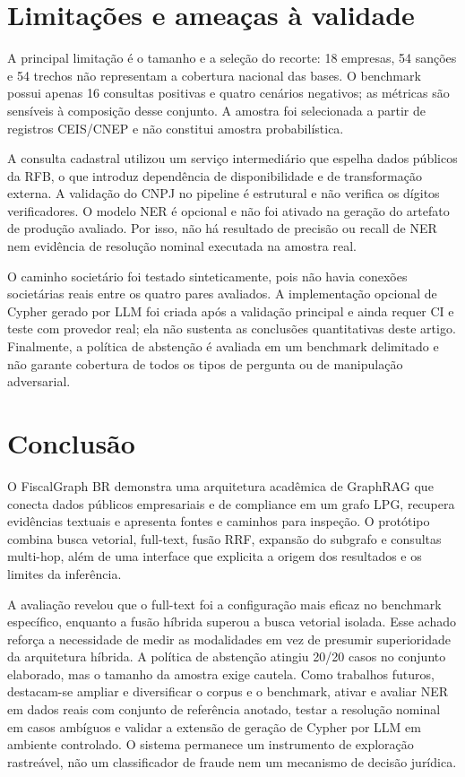 \documentclass[12pt]{article}
\begin{document}
\section{Limitações e ameaças à validade}

A principal limitação é o tamanho e a seleção do recorte: 18 empresas, 54 sanções e 54 trechos não representam a cobertura nacional das bases. O benchmark possui apenas 16 consultas positivas e quatro cenários negativos; as métricas são sensíveis à composição desse conjunto. A amostra foi selecionada a partir de registros CEIS/CNEP e não constitui amostra probabilística.

A consulta cadastral utilizou um serviço intermediário que espelha dados públicos da RFB, o que introduz dependência de disponibilidade e de transformação externa. A validação do CNPJ no pipeline é estrutural e não verifica os dígitos verificadores. O modelo NER é opcional e não foi ativado na geração do artefato de produção avaliado. Por isso, não há resultado de precisão ou recall de NER nem evidência de resolução nominal executada na amostra real.

O caminho societário foi testado sinteticamente, pois não havia conexões societárias reais entre os quatro pares avaliados. A implementação opcional de Cypher gerado por LLM foi criada após a validação principal e ainda requer CI e teste com provedor real; ela não sustenta as conclusões quantitativas deste artigo. Finalmente, a política de abstenção é avaliada em um benchmark delimitado e não garante cobertura de todos os tipos de pergunta ou de manipulação adversarial.

\section{Conclusão}

O FiscalGraph BR demonstra uma arquitetura acadêmica de GraphRAG que conecta dados públicos empresariais e de compliance em um grafo LPG, recupera evidências textuais e apresenta fontes e caminhos para inspeção. O protótipo combina busca vetorial, full-text, fusão RRF, expansão do subgrafo e consultas multi-hop, além de uma interface que explicita a origem dos resultados e os limites da inferência.

A avaliação revelou que o full-text foi a configuração mais eficaz no benchmark específico, enquanto a fusão híbrida superou a busca vetorial isolada. Esse achado reforça a necessidade de medir as modalidades em vez de presumir superioridade da arquitetura híbrida. A política de abstenção atingiu 20/20 casos no conjunto elaborado, mas o tamanho da amostra exige cautela. Como trabalhos futuros, destacam-se ampliar e diversificar o corpus e o benchmark, ativar e avaliar NER em dados reais com conjunto de referência anotado, testar a resolução nominal em casos ambíguos e validar a extensão de geração de Cypher por LLM em ambiente controlado. O sistema permanece um instrumento de exploração rastreável, não um classificador de fraude nem um mecanismo de decisão jurídica.



\end{document}
